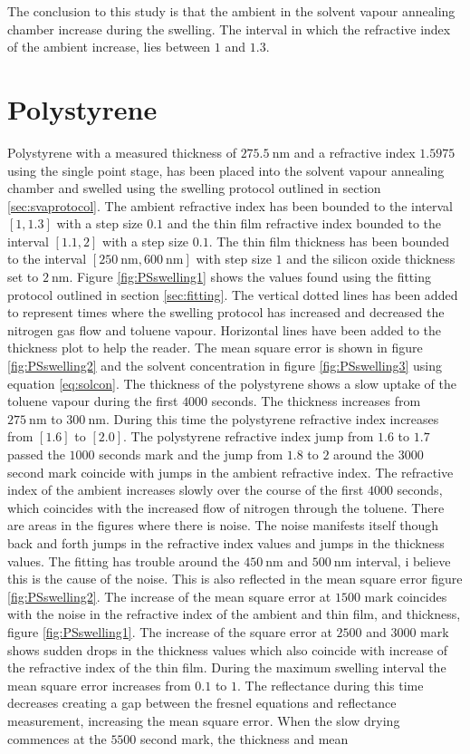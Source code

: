 \documentclass[MasterThesisMain.tex]{subfiles}
\begin{document}
The conclusion to this study is that the ambient in the solvent vapour annealing chamber increase during the swelling. The interval in which the refractive index of the ambient increase, lies between $1$ and $1.3$. 
	
\section{Polystyrene}
Polystyrene with a measured thickness of $\SI{275.5}{\nano\meter}$ and a refractive index $1.5975$ using the single point stage, has been placed into the solvent vapour annealing chamber and swelled using the swelling protocol outlined in section \ref{sec:svaprotocol}. The ambient refractive index has been bounded to the interval $[1,1.3]$ with a step size $0.1$ and the thin film refractive index bounded to the interval $[1.1,2]$ with a step size $0.1$. The thin film thickness has been bounded to the interval $[\SI{250}{\nano\meter},\SI{600}{\nano\meter}]$ with step size $1$ and the silicon oxide thickness set to $\SI{2}{\nano\meter}$. Figure \ref{fig:PSswelling1} shows the values found using the fitting protocol outlined in section \ref{sec:fitting}. The vertical dotted lines has been added to represent times where the swelling protocol has increased and decreased the nitrogen gas flow and toluene vapour. Horizontal lines have been added to the thickness plot to help the reader. The mean square error is shown in figure \ref{fig:PSswelling2} and the solvent concentration in figure \ref{fig:PSswelling3} using equation \ref{eq:solcon}. The thickness of the polystyrene shows a slow uptake of the toluene vapour during the first $4000$ seconds. The thickness increases from $\SI{275}{\nano\meter}$ to $\SI{300}{\nano\meter}$. During this time the polystyrene refractive index increases from $[1.6]$ to $[2.0]$. The polystyrene refractive index jump from $1.6$ to $1.7$ passed the $1000$ seconds mark and the jump from $1.8$ to $2$ around the $3000$ second mark coincide with jumps in the ambient refractive index. The refractive index of the ambient increases slowly over the course of the first $4000$ seconds, which coincides with the increased flow of nitrogen through the toluene. There are areas in the figures where there is noise. The noise manifests itself though back and forth jumps in the refractive index values and jumps in the thickness values. The fitting has trouble around the $\SI{450}{\nano\meter}$ and $\SI{500}{\nano\meter}$ interval, i believe this is the cause of the noise. This is also reflected in the mean square error figure \ref{fig:PSswelling2}. The increase of the mean square error at $1500$ mark coincides with the noise in the refractive index of the ambient and thin film, and thickness, figure \ref{fig:PSswelling1}. The increase of the square error at $2500$ and $3000$ mark shows sudden drops in the thickness values which also coincide with increase of the refractive index of the thin film. During the maximum swelling interval the mean square error increases from $0.1$ to $1$. The reflectance during this time decreases creating a gap between the fresnel equations and reflectance measurement, increasing the mean square error. When the slow drying commences at the $5500$ second mark, the thickness and mean 
\end{document}
